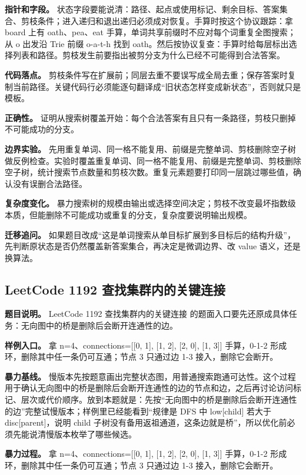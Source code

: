 \textbf{指针和字段。} 状态字段要能说清：路径、起点或使用标记、剩余目标、答案集合、剪枝条件；进入递归和退出递归必须成对恢复。手算时按这个协议跟踪：拿 board 上有 oath、pea、eat 手算，单词共享前缀时不应对每个词重复全图搜索；从 o 出发沿 Trie 前缀 o-a-t-h 找到 oath。然后按协议复查：手算时给每层标出选择列表和路径。剪枝发生前要指出被剪分支为什么已经不可能得到合法答案。

\textbf{代码落点。} 剪枝条件写在扩展前；同层去重不要误写成全局去重；保存答案时复制当前路径。关键代码行必须能逐句翻译成“旧状态怎样变成新状态”，否则就只是模板。

\textbf{正确性。} 证明从搜索树覆盖开始：每个合法答案有且只有一条路径，剪枝只删掉不可能成功的分支。

\textbf{边界实验。} 先用重复单词、同一格不能复用、前缀是完整单词、剪枝删除空子树做反例检查。实验时覆盖重复单词、同一格不能复用、前缀是完整单词、剪枝删除空子树，统计搜索节点数量和剪枝次数。重复元素题要打印同一层跳过哪些值，确认没有误删合法路径。

\textbf{复杂度变化。} 暴力搜索树的规模由输出或选择空间决定；剪枝不改变最坏指数级本质，但能删除不可能成功或重复的分支，复杂度要说明输出规模。

\textbf{迁移追问。} 如果题目改成“这是单词搜索从单目标扩展到多目标后的结构升级”，先判断原状态是否仍然覆盖新答案集合，再决定是微调边界、改 value 语义，还是换算法。

\subsection{LeetCode 1192 查找集群内的关键连接}

\textbf{题目说明。} LeetCode 1192 查找集群内的关键连接 的题面入口要先还原成具体任务：无向图中的桥是删除后会断开连通性的边。

\textbf{样例入口。} 拿 n=4、connections=[[0, 1], [1, 2], [2, 0], [1, 3]] 手算，0-1-2 形成环，删除其中任一条仍可互通；节点 3 只通过边 1-3 接入，删除它会断开。

\textbf{暴力基线。} 慢版本先按题意画出完整状态图，用普通搜索跑通可达性。这个过程用于确认无向图中的桥是删除后会断开连通性的边的节点和边，之后再讨论访问标记、层次或代价顺序。放到本题就是：先按“无向图中的桥是删除后会断开连通性的边”完整试慢版本；样例里已经能看到“规律是 DFS 中 low[child] 若大于 disc[parent]，说明 child 子树没有备用返祖通道，这条边就是桥”，所以优化前必须先能说清慢版本枚举了哪些候选。

\textbf{暴力过程。} 拿 n=4、connections=[[0, 1], [1, 2], [2, 0], [1, 3]] 手算，0-1-2 形成环，删除其中任一条仍可互通；节点 3 只通过边 1-3 接入，删除它会断开。

